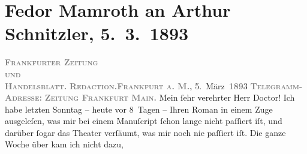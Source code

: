 

         
         \renewcommand{\erwaehntePersonen}{Personen: Fedor Mamroth, Leo N. von Tolstoi}
         \renewcommand{\erwaehnteInstitutionen}{Institutionen: Frankfurter Zeitung}
         \renewcommand{\erwaehnteOrte}{Orte: Deutschland, Frankfurt am Main, Wien, Österreich}
         \renewcommand{\erwaehnteWerke}{Werke: Krieg und Frieden, Sterben. Novelle}
               \section[Fedor Mamroth an Arthur Schnitzler, 5. 3. 1893]{ Fedor Mamroth an Arthur Schnitzler, 5. 3. 1893}\nopagebreak{}\rehead{ }\begin{ledgroupsized}[t]{13cm}\normalsize\beginnumbering \toendnotes[C]{\smallbreak\pagebreak[2]} 
\toendnotes[C]{\smallbreak}\pstart
           \noindent{}{\pb}\textcolor{gray}{\textbf{\textsc{Frankfurter Zeitung}}}{\\}\textsc{\textcolor{gray}{\textbf{und}}}{\\}\textcolor{gray}{\textbf{\textsc{Handelsblatt.}}}\pend
           \pstart
           \textcolor{gray}{\textbf{\textsc{Redaction.}}}\hfill \textcolor{gray}{\textbf{\textsc{Frankfurt a. M.,}}}{ }5. März \textsc{\textcolor{gray}{\textbf{189}}}3\pend
           \pstart
           \textcolor{gray}{\textbf{\textsc{Telegramm-Adresse:}}}\pend
           \pstart
           \textcolor{gray}{\textbf{\textsc{Zeitung Frankfurt Main.}}}\pend
           \pstart{}Mein ſehr verehrter Herr Doctor!\pend\pstart
           Ich habe letzten Sonntag – heute vor 8 Tagen – Ihren Roman in einem Zuge ausgeleſen, was mir bei
               einem Manuſcript ſchon lange nicht paſſiert iſt, und darüber ſogar das Theater
               verſäumt, was mir noch nie paſſiert iſt. Die ganze Woche über kam ich nicht dazu,

\end{ledgroupsized}
